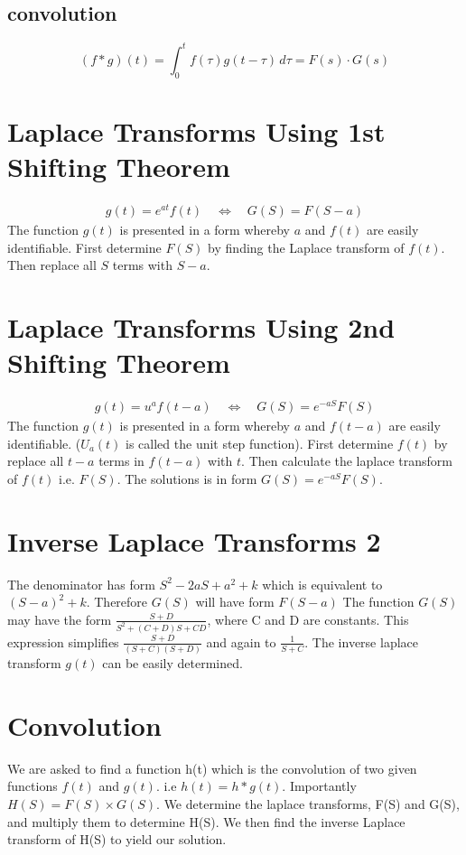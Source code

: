 \documentclass[12pt, a4paper]{article}
\begin{document}
\subsection{convolution}

\[ (f * g)(t) = \int_0^t f(\tau)g(t-\tau)\,d\tau= F(s) \cdot G(s) \]



\section{Laplace Transforms Using 1st Shifting Theorem}
\begin{eqnarray}
g(t) = e^{at}f(t) \quad \Leftrightarrow \quad G(S)= F(S-a) \nonumber
\end{eqnarray}
The function $g(t)$ is presented in a form whereby $a$ and $f(t)$
are easily identifiable. First determine $F(S)$ by finding the
Laplace transform of $f(t)$. Then replace all $S$ terms with
$S-a$.



\section{Laplace Transforms Using 2nd Shifting Theorem}

\begin{eqnarray}
 g(t) = u^{a}f(t-a) \quad \Leftrightarrow \quad G(S)= e^{-aS}F(S) \nonumber
\end{eqnarray}
The function $g(t)$ is presented in a form whereby $a$ and
$f(t-a)$ are easily identifiable. ($U_{a}(t)$ is called the unit
step function). First determine $f(t)$ by replace all $t-a$ terms
in $f(t-a)$ with $t$. Then calculate the laplace transform of
$f(t)$ i.e. $F(S)$. The solutions is in form $G(S)= e^{-aS}F(S)$.


\section{Inverse Laplace Transforms 2}

The denominator has form $S^2 - 2aS + a^2 + k$ which is equivalent
to $(S-a)^2 + k$. Therefore $G(S)$ will have form $F(S-a)$
\newline
The function $G(S)$ may have the form $\frac{S+D}{S^2 +(C+D)S +
CD}$, where C and D are constants. This expression simplifies
$\frac{S+D}{(S+C)(S+D)}$ and again to $\frac{1}{S+C}$. The inverse
laplace transform $g(t)$ can be easily determined.
\section{Convolution}
We are asked to find a function h(t) which is the convolution of
two given functions $f(t)$ and $g(t)$. i.e $h(t)=h*g(t)$.\newline
Importantly $H(S) = F(S)\times G(S)$. We determine the laplace
transforms, F(S) and G(S), and multiply them to determine H(S). We
then find the inverse Laplace transform of H(S) to yield our
solution.
\end{document}
